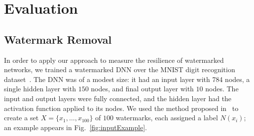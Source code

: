 \documentclass{easychair}
\newcommand{\relu}{\text{ReLU}\xspace{}}
\newcommand{\guy}[1]{\marginpar{\textcolor{orange}{Guy: #1}}}
\begin{document}
\section{Evaluation}
\label{sec:evaluation}

\subsection{Watermark Removal}

In order to apply our approach to measure the resilience of
watermarked networks, we trained a watermarked DNN over the MNIST
digit recognition dataset~\cite{mnist}. The DNN was of a modest size:
it had an input layer with 784 nodes, a single hidden layer with $150$
nodes, and final output layer with $10$ nodes. The input and output layers were fully
connected, and the hidden layer had the \relu{} activation function
applied to its nodes. We used the
method proposed in~\cite{AdBaPiKeWatermarking} to create a set
$X=\{x_1,\ldots, x_{100}\}$ of $100$ watermarks, each assigned a label
$N(x_i)$; an example appears in Fig.~\ref{fig:inputExample}.
\guy{TODO: fix broken ref, subfigure is messing it up}
\end{document}
